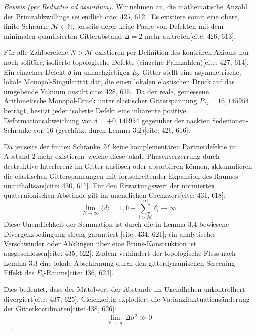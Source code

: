 \documentclass[11pt,a4paper]{article}
\newcommand{\Eoct}{E_8}
\theoremstyle{definition}
\begin{document}
	\begin{proof}[Beweis (per Reductio ad absurdum)]
		Wir nehmen an, die mathematische Anzahl der Primzahlzwillinge sei endlich[cite: 425, 612]. Es existiere somit eine obere, finite Schranke $\mathcal{M} \in \mathbb{N}$, jenseits derer keine Paare von Defekten mit dem minimalen quantisierten Gitterabstand $\Delta = 2$ mehr auftreten[cite: 426, 613].
		
		Für alle Zahlbereiche $N > \mathcal{M}$ existieren per Definition des konträren Axioms nur noch solitäre, isolierte topologische Defekte (einzelne Primzahlen)[cite: 427, 614]. Ein einzelner Defekt $\mathfrak{d}$ im unnachgiebigen $\Eoct$-Gitter stellt eine asymmetrische, lokale Monopol-Singularität dar, die einen lokalen elastischen Druck auf das umgebende Vakuum ausübt[cite: 428, 615]. Da der reale, gemessene Arithmetische Monopol-Druck unter elastischer Gitterspannung $P_M = 16{,}145954$ beträgt, besitzt jeder isolierte Defekt eine inhärente positive Deformationsabweichung von $\delta = +0{,}145954$ gegenüber der nackten Sedenionen-Schranke von $16$ (geschützt durch Lemma 3.2)[cite: 429, 616].
		
		Da jenseits der finiten Schranke $\mathcal{M}$ keine komplementären Partnerdefekte im Abstand $2$ mehr existieren, welche diese lokale Phasenverzerrung durch destruktive Interferenz im Gitter auslösen oder absorbieren können, akkumulieren die elastischen Gitterspannungen mit fortschreitender Expansion des Raumes unaufhaltsam[cite: 430, 617]. Für den Erwartungswert der normierten quaternionischen Abstände gilt im unendlichen Grenzwert[cite: 431, 618]:
		\begin{equation}
			\lim_{N \rightarrow \infty} \langle d \rangle = 1{,}0 + \sum_{i > \mathcal{M}}^{\infty} \delta_i \longrightarrow \infty
		\end{equation}
		Diese Unendlichkeit der Summation ist durch die in Lemma 3.4 bewiesene Divergenzbedingung streng garantiert [cite: 434, 621]; ein analytisches Verschwinden oder Abklingen über eine Bruns-Konstruktion ist ausgeschlossen[cite: 435, 622]. Zudem verhindert der topologische Fluss nach Lemma 3.3 eine lokale Abschirmung durch den gitterdynamischen Screening-Effekt des $\Eoct$-Raums[cite: 436, 624]. 
		
		Dies bedeutet, dass der Mittelwert der Abstände im Unendlichen unkontrolliert divergiert[cite: 437, 625]. Gleichzeitig explodiert die Varianzfluktuationsänderung der Gitterkoordinaten[cite: 438, 626]:
		\begin{equation}
			\lim_{N \rightarrow \infty} \Delta \sigma^2 \gg 0
		\end{equation}
		

\end{proof}
\end{document}

